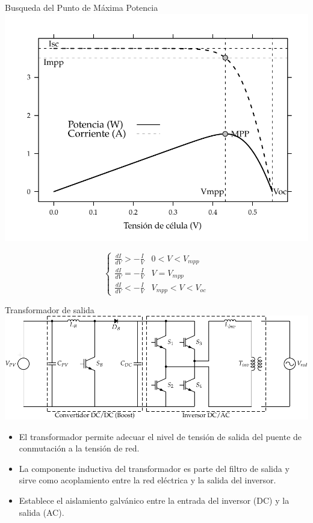 \documentclass[xcolor={usenames,svgnames,dvipsnames}]{beamer}
\begin{document}
\begin{frame}[label=sec-2-5-3]{Busqueda del Punto de Máxima Potencia}
\includegraphics[width=.9\linewidth]{../figs/CurvaIV_Ta20_G800.pdf}

$$\begin{cases}
      \frac{dI}{dV}>-\frac{I}{V} & 0<V<V_{mpp}\\
      \frac{dI}{dV}=-\frac{I}{V} & V=V_{mpp}\\
      \frac{dI}{dV}<-\frac{I}{V} & V_{mpp}<V<V_{oc}\end{cases}$$
\end{frame}

\begin{frame}[label=sec-2-5-4]{Transformador de salida}
\includegraphics[width=.9\linewidth]{../figs/InversorPV.pdf}

\begin{itemize}
\item El transformador permite adecuar el nivel de tensión de salida del
puente de conmutación a la tensión de red.

\item La componente inductiva del transformador es parte del filtro de
salida y sirve como acoplamiento entre la red eléctrica y la salida
del inversor.

\item Establece el aislamiento galvánico entre la entrada del inversor (DC)
y la salida (AC).
\end{itemize}
\end{frame}
\end{document}
